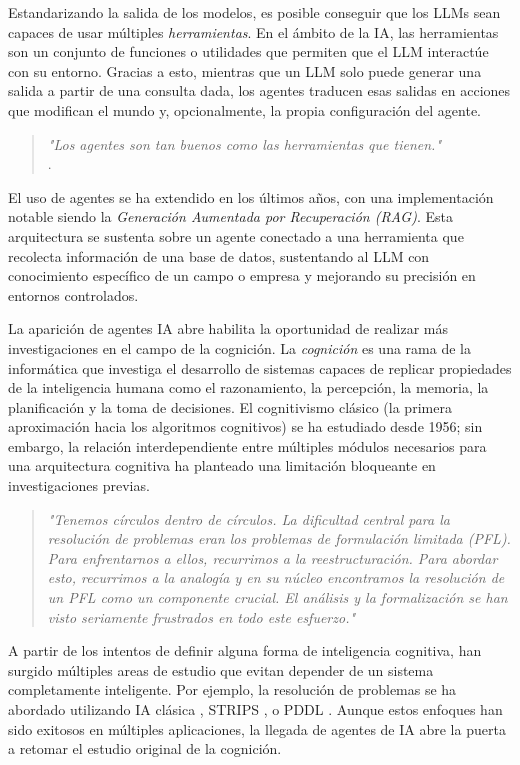 Estandarizando la salida de los modelos, es posible conseguir que los LLMs sean
capaces de usar múltiples \emph{herramientas}. En el ámbito de la IA, las
herramientas son un conjunto de funciones o utilidades que permiten que el LLM
interactúe con su entorno. Gracias a esto, mientras que un LLM solo puede
generar una salida a partir de una consulta dada, los agentes traducen esas
salidas en acciones que modifican el mundo y, opcionalmente, la propia
configuración del agente.

\begin{quote} \small\textit{
    "Los agentes son tan buenos como las herramientas que tienen."
} \\ 
\citep{langchain-docs-2024}.  \end{quote}

El uso de agentes se ha extendido en los últimos años, con una implementación
notable siendo la \emph{Generación Aumentada por Recuperación (RAG)}. Esta
arquitectura se sustenta sobre un agente conectado a una herramienta que
recolecta información de una base de datos, sustentando al LLM con conocimiento
específico de un campo o empresa y mejorando su precisión en entornos controlados.

La aparición de agentes IA abre habilita la oportunidad de realizar más
investigaciones en el campo de la cognición. La \emph{cognición} es una rama de la
informática que investiga el desarrollo de sistemas capaces de replicar
propiedades de la inteligencia humana como el razonamiento, la percepción, la
memoria, la planificación y la toma de decisiones. El cognitivismo clásico (la
primera aproximación hacia los algoritmos cognitivos) se ha estudiado desde
1956; sin embargo, la relación interdependiente entre múltiples módulos
necesarios para una arquitectura cognitiva ha planteado una limitación
bloqueante en investigaciones previas.

\begin{quote} \small\textit{ 
    "Tenemos círculos dentro de círculos. La dificultad central para la
    resolución de problemas eran los problemas de formulación limitada (PFL).
    Para enfrentarnos a ellos, recurrimos a la reestructuración.  Para abordar
    esto, recurrimos a la analogía y en su núcleo encontramos la resolución de
    un PFL como un componente crucial. El análisis y la formalización se han
    visto seriamente frustrados en todo este esfuerzo."
\citet{vervaeke1999naturalistic} } \end{quote}

A partir de los intentos de definir alguna forma de inteligencia cognitiva, han
surgido múltiples areas de estudio que evitan depender de un sistema
completamente inteligente. Por ejemplo, la resolución de problemas se ha
abordado utilizando IA clásica \citep{russell2016artificial}, STRIPS
\citep{fikes1971strips}, o PDDL \citep{aeronautiques1998pddl}. Aunque estos
enfoques han sido exitosos en múltiples aplicaciones, la llegada de agentes de
IA abre la puerta a retomar el estudio original de la cognición.

